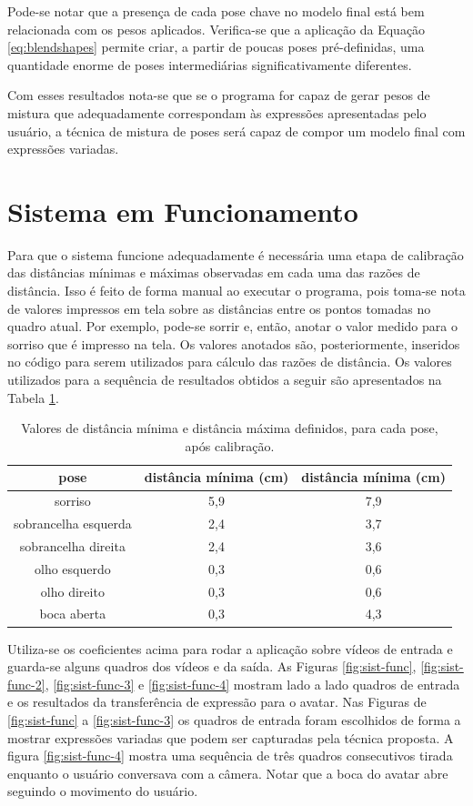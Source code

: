 Pode-se notar que a presença de cada pose chave no modelo final está bem
relacionada com os pesos aplicados. Verifica-se que a aplicação da Equação
\ref{eq:blendshapes} permite criar, a partir de poucas poses pré-definidas, uma
quantidade enorme de poses intermediárias significativamente diferentes.

Com esses resultados nota-se que se o programa for capaz de gerar pesos de
mistura que adequadamente correspondam às expressões apresentadas pelo usuário,
a técnica de mistura de poses será capaz de compor um modelo final com
expressões variadas.

\section{Sistema em Funcionamento}

Para que o sistema funcione adequadamente é necessária uma etapa de calibração
das distâncias mínimas e máximas observadas em cada uma das razões de distância.
Isso é feito de forma manual ao executar o programa, pois toma-se nota de
valores impressos em tela sobre as distâncias entre os pontos tomadas no quadro
atual. Por exemplo, pode-se sorrir e, então, anotar o valor medido para o
sorriso que é impresso na tela. Os valores anotados são, posteriormente,
inseridos no código para serem utilizados para cálculo das razões de distância.
Os valores utilizados para a sequência de resultados obtidos a seguir são
apresentados na Tabela \ref{tab:distance-ratio-coeffs}.

\begin{table}
\centering
\begin{tabular}{|c|c|c|}
\hline
pose & distância mínima (cm) & distância mínima (cm) \\ \hline
sorriso & 5,9 & 7,9 \\ \hline
sobrancelha esquerda & 2,4 & 3,7 \\ \hline
sobrancelha direita & 2,4 & 3,6 \\ \hline
olho esquerdo & 0,3 & 0,6 \\ \hline
olho direito & 0,3 & 0,6 \\ \hline
boca aberta & 0,3 & 4,3 \\ \hline
\end{tabular}
\caption{Valores de distância mínima e distância máxima definidos, para cada pose, após calibração.}
\label{tab:distance-ratio-coeffs}
\end{table}

Utiliza-se os coeficientes acima para rodar a aplicação sobre vídeos de entrada
e guarda-se alguns quadros dos vídeos e da saída.  As Figuras
\ref{fig:sist-func}, \ref{fig:sist-func-2}, \ref{fig:sist-func-3} e
\ref{fig:sist-func-4} mostram lado a lado quadros de entrada e os resultados da
transferência de expressão para o avatar. Nas Figuras de \ref{fig:sist-func} a
\ref{fig:sist-func-3} os quadros de entrada foram escolhidos de forma a mostrar
expressões variadas que podem ser capturadas pela técnica proposta. A figura
\ref{fig:sist-func-4} mostra uma sequência de três quadros consecutivos tirada
enquanto o usuário conversava com a câmera. Notar que a boca do avatar abre
seguindo o movimento do usuário.

